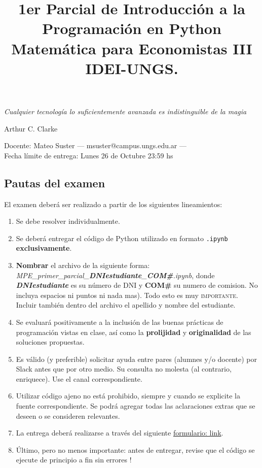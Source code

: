 \documentclass[a4paper,11pt]{article}
\title{1er Parcial de Introducción a la Programación en Python\\ Matemática para Economistas III \\ IDEI-UNGS.}
\begin{document}
\maketitle
\epigraph{\itshape Cualquier tecnología lo suficientemente avanzada es indistinguible de la magia}{Arthur C. Clarke}

\noindent Docente: Mateo Suster --- msuster@campus.ungs.edu.ar --- \\
Fecha límite de entrega: Lunes 26 de Octubre 23:59 hs

\subsection*{Pautas del examen}
El examen deberá ser realizado a partir de los siguientes lineamientos:
\begin{enumerate}
	\item Se debe resolver individualmente.
	\item Se deberá entregar el código de Python utilizado en formato \texttt{.ipynb} \textbf{exclusivamente}.
	\item \textbf{Nombrar} el archivo de la siguiente forma: \textit{MPE\_primer\_parcial\_\textbf{DNIestudiante}\_\textbf{COM\#}.ipynb}, donde \textit{\textbf{DNIestudiante}} es su número de DNI y \textbf{COM\#} su numero de comision. No incluya espacios ni puntos ni nada mas). Todo esto es muy \textsc{importante}. Incluir también dentro del archivo el apellido y nombre del estudiante.
	\item Se evaluará positivamente a la inclusión de las buenas prácticas de programación vistas en clase, así como la \textbf{prolijidad} y \textbf{originalidad} de las soluciones propuestas.
	\item Es válido (y preferible) solicitar ayuda entre pares (alumnes y/o docente) por Slack antes que por otro medio. Su consulta no molesta (al contrario, enriquece). Use el canal correspondiente.
	\item Utilizar código ajeno no está prohibido, siempre y cuando se explicite la fuente correspondiente. Se podrá agregar todas las aclaraciones extras que se deseen o se consideren relevantes.
	\item La entrega deberá realizarse a través del siguiente \href{https://forms.gle/Soa7atCjPkyCyGum7}{formulario: link}.
	\item Último, pero no menos importante: antes de entregar, revise que el código se ejecute de principio a fin sin errores !
\end{enumerate}
\end{document}

